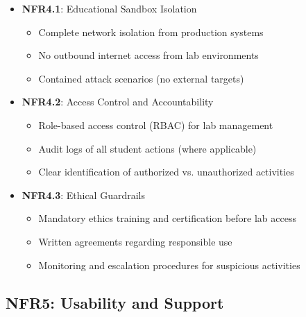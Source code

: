 \begin{itemize}

\item \textbf{NFR4.1}: Educational Sandbox Isolation
\begin{itemize}
\item Complete network isolation from production systems
\item No outbound internet access from lab environments
\item Contained attack scenarios (no external targets)
\end{itemize}

\item \textbf{NFR4.2}: Access Control and Accountability
\begin{itemize}
\item Role-based access control (RBAC) for lab management
\item Audit logs of all student actions (where applicable)
\item Clear identification of authorized vs. unauthorized activities
\end{itemize}

\item \textbf{NFR4.3}: Ethical Guardrails
\begin{itemize}
\item Mandatory ethics training and certification before lab access
\item Written agreements regarding responsible use
\item Monitoring and escalation procedures for suspicious activities
\end{itemize}

\end{itemize}

\subsection{NFR5: Usability and Support}

